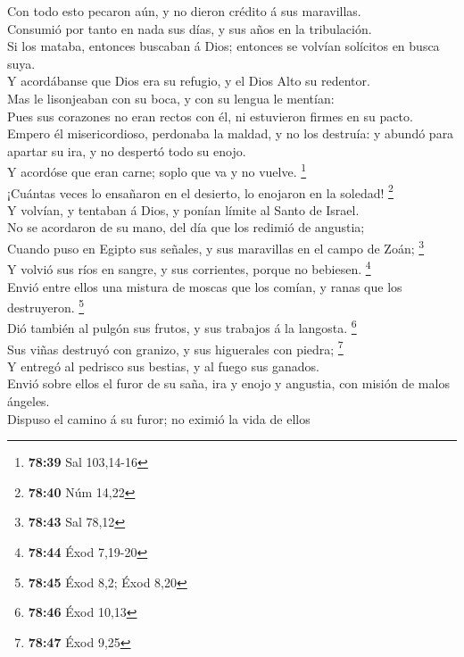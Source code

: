  Con todo esto pecaron aún, y no dieron crédito á sus
maravillas.\\
 Consumió por tanto en nada sus días, y sus años en la
tribulación.\\
 Si los mataba, entonces buscaban á Dios; entonces se
volvían solícitos en busca suya.\\
 Y acordábanse que Dios era su refugio, y el Dios Alto su
redentor.\\
 Mas le lisonjeaban con su boca, y con su lengua le
mentían:\\
 Pues sus corazones no eran rectos con él, ni estuvieron
firmes en su pacto.\\
 Empero él misericordioso, perdonaba la maldad, y no los
destruía: y abundó para apartar su ira, y no despertó todo su enojo.\\
 Y acordóse que eran carne; soplo que va y no vuelve.
\footnote{\textbf{78:39} Sal 103,14-16}\\
 ¡Cuántas veces lo ensañaron en el desierto, lo enojaron en
la soledad! \footnote{\textbf{78:40} Núm 14,22}\\
 Y volvían, y tentaban á Dios, y ponían límite al Santo de
Israel.\\
 No se acordaron de su mano, del día que los redimió de
angustia;\\
 Cuando puso en Egipto sus señales, y sus maravillas en el
campo de Zoán; \footnote{\textbf{78:43} Sal 78,12}\\
 Y volvió sus ríos en sangre, y sus corrientes, porque no
bebiesen. \footnote{\textbf{78:44} Éxod 7,19-20}\\
 Envió entre ellos una mistura de moscas que los comían, y
ranas que los destruyeron. \footnote{\textbf{78:45} Éxod 8,2; Éxod 8,20}\\
 Dió también al pulgón sus frutos, y sus trabajos á la
langosta. \footnote{\textbf{78:46} Éxod 10,13}\\
 Sus viñas destruyó con granizo, y sus higuerales con
piedra; \footnote{\textbf{78:47} Éxod 9,25}\\
 Y entregó al pedrisco sus bestias, y al fuego sus
ganados.\\
 Envió sobre ellos el furor de su saña, ira y enojo y
angustia, con misión de malos ángeles.\\
 Dispuso el camino á su furor; no eximió la vida de ellos
